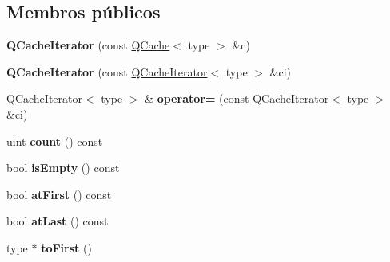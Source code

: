 \subsection*{Membros públicos}
\begin{DoxyCompactItemize}
\item 
\hypertarget{class_q_cache_iterator_a5ddfbf2464507b4ad09e86999ff29424}{{\bfseries Q\-Cache\-Iterator} (const \hyperlink{class_q_cache}{Q\-Cache}$<$ type $>$ \&c)}\label{class_q_cache_iterator_a5ddfbf2464507b4ad09e86999ff29424}

\item 
\hypertarget{class_q_cache_iterator_a8c4bd9e1ebfe382f53f1db9f2346a94b}{{\bfseries Q\-Cache\-Iterator} (const \hyperlink{class_q_cache_iterator}{Q\-Cache\-Iterator}$<$ type $>$ \&ci)}\label{class_q_cache_iterator_a8c4bd9e1ebfe382f53f1db9f2346a94b}

\item 
\hypertarget{class_q_cache_iterator_a8caec70cf946b7b51622dc24ea3b349d}{\hyperlink{class_q_cache_iterator}{Q\-Cache\-Iterator}$<$ type $>$ \& {\bfseries operator=} (const \hyperlink{class_q_cache_iterator}{Q\-Cache\-Iterator}$<$ type $>$ \&ci)}\label{class_q_cache_iterator_a8caec70cf946b7b51622dc24ea3b349d}

\item 
\hypertarget{class_q_cache_iterator_a774149fc271ebaba2aabcd183a836e8f}{uint {\bfseries count} () const }\label{class_q_cache_iterator_a774149fc271ebaba2aabcd183a836e8f}

\item 
\hypertarget{class_q_cache_iterator_a479432127ee77145cc19d6a2d1590821}{bool {\bfseries is\-Empty} () const }\label{class_q_cache_iterator_a479432127ee77145cc19d6a2d1590821}

\item 
\hypertarget{class_q_cache_iterator_a31ccd7308e8fa3fa71c847fec15eceb3}{bool {\bfseries at\-First} () const }\label{class_q_cache_iterator_a31ccd7308e8fa3fa71c847fec15eceb3}

\item 
\hypertarget{class_q_cache_iterator_aa158c7c7d48ef7ab1e349457aa795878}{bool {\bfseries at\-Last} () const }\label{class_q_cache_iterator_aa158c7c7d48ef7ab1e349457aa795878}

\item 
\hypertarget{class_q_cache_iterator_a7e3cadfe5d178fc4db2e97112af20024}{type $\ast$ {\bfseries to\-First} ()}\label{class_q_cache_iterator_a7e3cadfe5d178fc4db2e97112af20024}


\end{DoxyCompactItemize}
